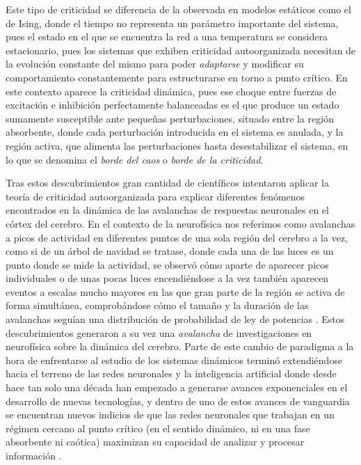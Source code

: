 \documentclass[11pt,a4paper,twoside,pdf]{article}
\numberwithin{equation}{section}
\begin{document}
Este tipo de criticidad se diferencia de la observada en modelos estáticos como el de Ising, donde el tiempo no representa un parámetro importante del sistema, pues el estado en el que se encuentra la red a una temperatura se considera estacionario, pues los sistemas que exhiben criticidad autoorganizada necesitan de la evolución constante del mismo para poder \emph{adaptarse} y modificar su comportamiento constantemente para estructurarse en torno a punto crítico. En este contexto aparece la criticidad dinámica, pues ese choque entre fuerzas de excitación e inhibición perfectamente balanceadas es el que produce un estado sumamente susceptible ante pequeñas perturbaciones, situado entre la región absorbente, donde cada perturbación introducida en el sistema es anulada, y la región activa, que alimenta las perturbaciones hasta desestabilizar el sistema, en lo que se denomina el \emph{borde del caos} o \emph{borde de la criticidad}.


Tras estos descubrimientos gran cantidad de científicos intentaron aplicar la teoría de criticidad autoorganizada para explicar diferentes fenómenos encontrados en la dinámica de las avalanchas de respuestas neuronales en el córtex del cerebro. En el contexto de la neurofísica nos referimos como avalanchas a picos de actividad en diferentes puntos de una sola región del cerebro a la vez, como si de un árbol de navidad se tratase, donde cada una de las luces es un punto donde se mide la actividad, se observó cómo aparte de aparecer picos individuales o de unas pocas luces encendiéndose a la vez también aparecen eventos a escalas mucho mayores en las que gran parte de la región se activa de forma simultánea, comprobándose cómo el tamaño y la duración de las avalanchas seguían una distribución de probabilidad de ley de potencias \parencite{beggs2003}. Estos descubrimientos generaron a su vez una \emph{avalancha} de investigaciones en neurofísica sobre la dinámica del cerebro. Parte de este cambio de paradigma a la hora de enfrentarse al estudio de los sistemas dinámicos terminó extendiéndose hacia el terreno de las redes neuronales y la inteligencia artificial donde desde hace tan solo una década han empezado a generarse avances exponenciales en el desarrollo de nuevas tecnologías, y dentro de uno de estos avances de vanguardia se encuentran nuevos indicios de que las redes neuronales que trabajan en un régimen cercano al punto crítico (en el sentido dinámico, ni en una fase absorbente ni caótica) maximizan su capacidad de analizar y procesar información \parencite{bertschinger2004}.
\end{document}
